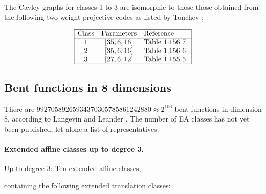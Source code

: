 \documentclass[12pt,a4paper]{article}
\begin{document}
The Cayley graphs for classes 1 to 3 are isomorphic to those those obtained from the following
two-weight projective
codes as listed by Tonchev \cite{Ton07codes}:

\begin{align*}
\begin{array}{|ccl|}
\hline
\text{Class} &
\text{Parameters} & \text{Reference}
\\
\hline
1 & [35,6,16] & \text{Table 1.156 7 }
\\
2 & [35,6,16] & \text{Table 1.156 6 }
\\
3 & [27,6,12] & \text{Table 1.155 5 }
\\
\hline
\end{array}
\end{align*}

\subsection{Bent functions in 8 dimensions}

There are
$99 270 589 265 934 370 305 785 861 242 880 \approx 2^{106}$ bent functions in dimension 8,
according to Langevin and Leander \cite{LanL11counting}.
%
%
The number of EA classes has not yet been published, let alone a list of representatives.

\paragraph*{Extended affine classes up to degree 3.}

Up to degree 3:
Ten extended affine classes,

containing the following extended translation classes:
\end{document}
